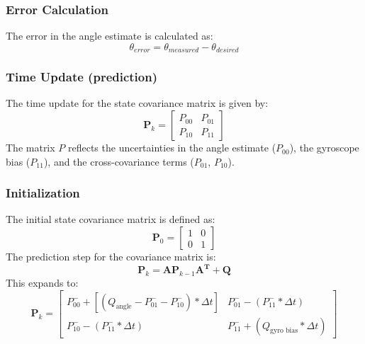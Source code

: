 \subsubsection{Error Calculation}
The error in the angle estimate is calculated as:
$$ \theta_{error} = \theta_{measured} - \theta_{desired} $$

\subsubsection{Time Update (prediction)}
The time update for the state covariance matrix is given by:
$$
\mathbf{P}_k = \begin{bmatrix} P_{00} & P_{01} \\ P_{10} & P_{11} \end{bmatrix}
$$
The matrix $P$ reflects the uncertainties in the angle estimate ($P_{00}$), the gyroscope bias ($P_{11}$), and the cross-covariance terms ($P_{01}$, $P_{10}$).

\subsubsection{Initialization}
The initial state covariance matrix is defined as:
$$\mathbf{P}_0 = \begin{bmatrix} 1 & 0 \\ 0 & 1 \end{bmatrix}$$
The prediction step for the covariance matrix is:
$$\mathbf{P}_k = \mathbf{A} \mathbf{P}_{k-1} \mathbf{A^T} + \mathbf{Q}$$
This expands to:
$$
\mathbf{P}_k = \begin{bmatrix} P_{00}^- + [(Q_{\text{angle}} - P_{01}^- - P_{10}^-)*\Delta t]  &  P_{01}^- - (P_{11}^-*\Delta t)  
	\\ P_{10}^- - (P_{11}^-*\Delta t)  &  P_{11}^- + (Q_{\text{gyro bias}}*\Delta t) \end{bmatrix}
$$

